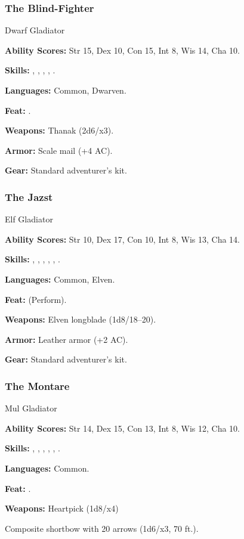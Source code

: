 \subsubsection{The Blind-Fighter}
Dwarf Gladiator

\textbf{Ability Scores:} Str 15, Dex 10, Con 15, Int 8, Wis 14, Cha 10.

\textbf{Skills:} , , , , .

\textbf{Languages:} Common, Dwarven.

\textbf{Feat:} .

\textbf{Weapons:} Thanak (2d6/x3).

\textbf{Armor:} Scale mail (+4 AC).

\textbf{Gear:} Standard adventurer's kit.

\subsubsection{The Jazst}
Elf Gladiator

\textbf{Ability Scores:} Str 10, Dex 17, Con 10, Int 8, Wis 13, Cha 14.

\textbf{Skills:} , , , , , .

\textbf{Languages:} Common, Elven.

\textbf{Feat:}  (Perform).

\textbf{Weapons:} Elven longblade (1d8/18--20).

\textbf{Armor:} Leather armor (+2 AC).

\textbf{Gear:} Standard adventurer's kit.

\subsubsection{The Montare}
Mul Gladiator

\textbf{Ability Scores:} Str 14, Dex 15, Con 13, Int 8, Wis 12, Cha 10.

\textbf{Skills:} , , , , , .

\textbf{Languages:} Common.

\textbf{Feat:} .

\textbf{Weapons:} Heartpick (1d8/x4)

Composite shortbow with 20 arrows (1d6/x3, 70 ft.).

